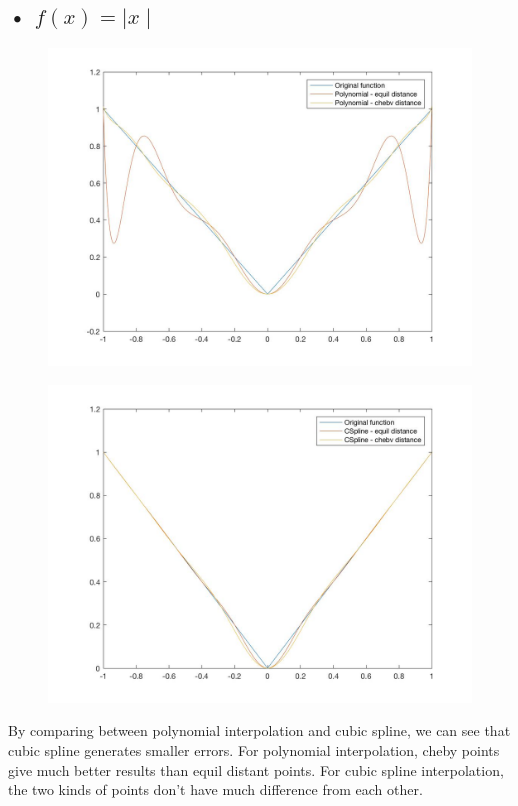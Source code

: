 \documentclass[11pt]{article} %
\begin{document}
\subsection{• $f(x)=\mid x\mid$}
\begin{figure}[H]
\centering
\begin{minipage}{.5\textwidth}
  \centering
  \includegraphics[width=1.1\linewidth]{e43p.jpg}
  \label{fig:test1}
\end{minipage}%
\begin{minipage}{.5\textwidth}
  \centering
  \includegraphics[width=1.1\linewidth]{e43s.jpg}
  \label{fig:test2}
\end{minipage}
\end{figure}
By comparing between polynomial interpolation and cubic spline, we can see that cubic spline generates smaller errors. For polynomial interpolation, cheby points give much better results than equil distant points. For cubic spline interpolation, the two kinds of points don't have much difference from each other. 
\end{document}
